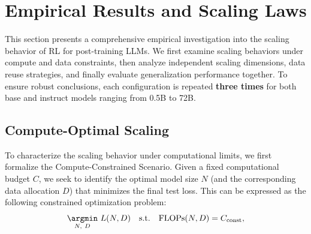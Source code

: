 \section{Empirical Results and Scaling Laws}
\label{sec:experimental_analysis}

This section presents a comprehensive empirical investigation into the scaling behavior of RL for post-training LLMs. We first examine scaling behaviors under compute and data constraints, then analyze independent scaling dimensions, data reuse strategies, and finally evaluate generalization performance together. To ensure robust conclusions, each configuration is repeated \textbf{three times} for both base and instruct models ranging from 0.5B to 72B.

\subsection{Compute-Optimal Scaling}

\label{subsec:compute_scaling}
To characterize the scaling behavior under computational limits, we first formalize the Compute-Constrained Scenario. Given a fixed computational budget $C$, we seek to identify the optimal model size $N$ (and the corresponding data allocation $D$) that minimizes the final test loss. This can be expressed as the following constrained optimization problem:
\begin{equation}
\label{eq:compute-constrained}
    \underset{N,~D}{\argmin} \ L(N, D) \quad \text{s.t.}\quad \mathrm{FLOPs}(N,D) = C_{\text{const}},
\end{equation}

